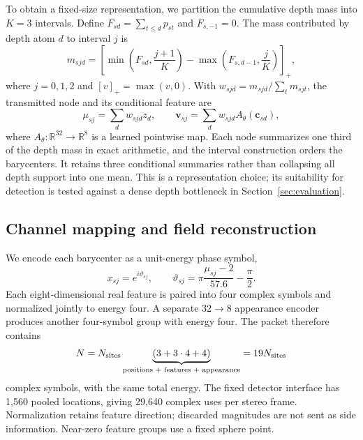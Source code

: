 \documentclass[conference]{IEEEtran}
\begin{document}
To obtain a fixed-size representation, we partition the cumulative depth
mass into $K=3$ intervals. Define $F_{sd}=\sum_{t\le d}p_{st}$ and
$F_{s,-1}=0$. The mass contributed by depth atom $d$ to interval $j$ is
\begin{equation}
 m_{sjd}=\left[\min\left(F_{sd},\frac{j+1}{K}\right)
             -\max\left(F_{s,d-1},\frac{j}{K}\right)\right]_+,
 \label{eq:mass}
\end{equation}
where $j=0,1,2$ and $[v]_+=\max(v,0)$. With
$w_{sjd}=m_{sjd}/\sum_t m_{sjt}$, the transmitted node and its conditional
feature are
\begin{equation}
 \mu_{sj}=\sum_d w_{sjd}z_d,\qquad
 \mathbf v_{sj}=\sum_d w_{sjd}A_\theta(\mathbf c_{sd}),
 \label{eq:barycenters}
\end{equation}
where $A_\theta:\mathbb R^{32}\to\mathbb R^8$ is a learned pointwise
map. Each node summarizes one third of the depth mass in exact arithmetic,
and the interval construction orders the barycenters. It retains three
conditional summaries rather than collapsing all depth support into one
mean. This is a representation choice; its suitability for detection is
tested against a dense depth bottleneck in Section~\ref{sec:evaluation}.

\subsection{Channel mapping and field reconstruction}
We encode each barycenter as a unit-energy phase symbol,
\begin{equation}
 x_{sj}=e^{i\vartheta_{sj}},\qquad
 \vartheta_{sj}=\pi\frac{\mu_{sj}-2}{57.6}-\frac{\pi}{2}.
 \label{eq:phase}
\end{equation}
Each eight-dimensional real feature is paired into four complex symbols
and normalized jointly to energy four. A separate
$32\!\to\!8$ appearance encoder produces another four-symbol group
with energy four. The packet therefore contains
\begin{equation}
 N= N_{\rm sites}\underbrace{(3+3\cdot4+4)}_{\text{positions + features + appearance}}
   =19N_{\rm sites}
 \label{eq:budget}
\end{equation}
complex symbols, with the same total energy. The fixed detector interface
has 1,560 pooled locations, giving 29,640 complex uses per stereo frame.
Normalization retains feature direction; discarded magnitudes are not sent
as side information. Near-zero feature groups use a fixed sphere point.
\end{document}
